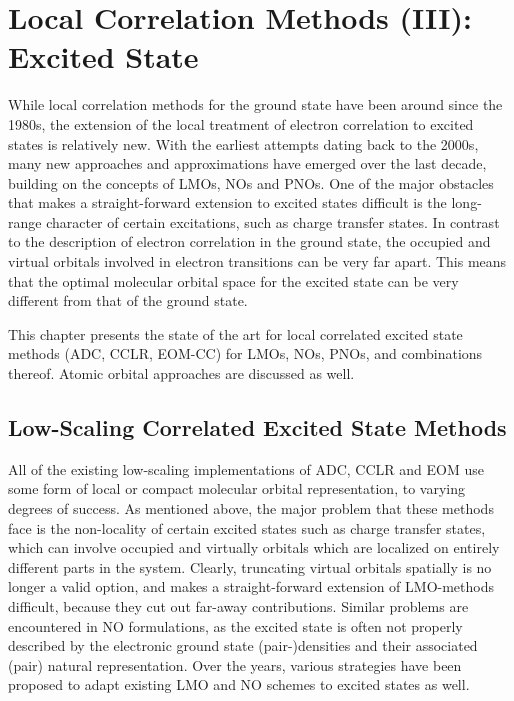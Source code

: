 \chapter{Local Correlation Methods (III): Excited State}

While local correlation methods for the ground state have been around since the 1980s, the extension of the local treatment of electron correlation to excited states is relatively new. With the earliest attempts dating back to the 2000s, many new approaches and approximations have emerged over the last decade, building on the concepts of LMOs, NOs and PNOs. One of the major obstacles that makes a straight-forward extension to excited states difficult is the long-range character of certain excitations, such as charge transfer states. In contrast to the description of electron correlation in the ground state, the occupied and virtual orbitals involved in electron transitions can be very far apart. This means that the optimal molecular orbital space for the excited state can be very different from that of the ground state. 

This chapter presents the state of the art for local correlated excited state methods (ADC, CCLR, EOM-CC) for LMOs, NOs, PNOs, and combinations thereof. Atomic orbital approaches are discussed as well. 



\section{Low-Scaling Correlated Excited State Methods}

All of the existing low-scaling implementations of ADC, CCLR and EOM use some form of local or compact molecular orbital representation, to varying degrees of success. As mentioned above, the major problem that these methods face is the non-locality of certain excited states such as charge transfer states, which can involve occupied and virtually orbitals which are localized on entirely different parts in the system. Clearly, truncating virtual orbitals spatially is no longer a valid option, and makes a straight-forward extension of LMO-methods difficult, because they cut out far-away contributions. Similar problems are encountered in NO formulations, as the excited state is often not properly described by the electronic ground state (pair-)densities and their associated (pair) natural representation. Over the years, various strategies have been proposed to adapt existing LMO and NO schemes to excited states as well. 

